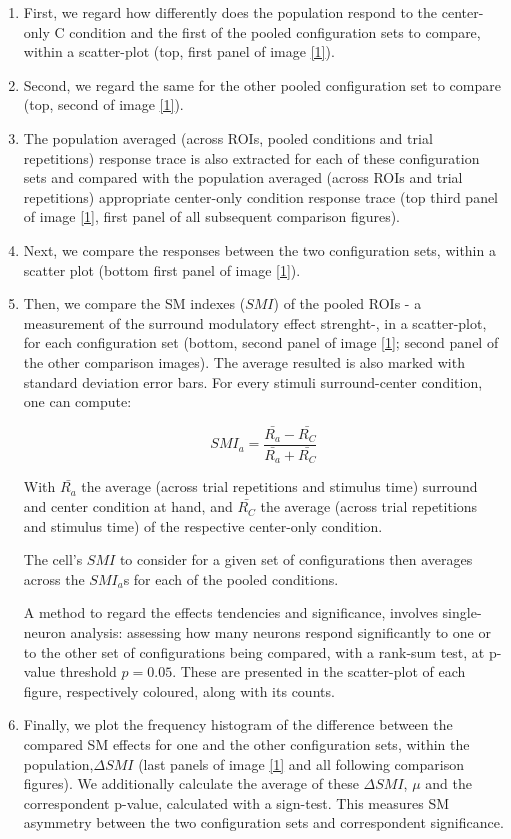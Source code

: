 \begin{enumerate}
\item First, we regard how differently does the population respond to the center-only C condition and the first of the pooled configuration sets to compare, within a scatter-plot (top, first panel of image \ref{1}). 

\item Second, we regard the same for the other pooled configuration set to compare (top, second of image \ref{1}). 

\item The population averaged (across ROIs, pooled conditions and trial repetitions) response trace is also extracted for each of these configuration sets and compared with the population averaged (across ROIs and trial repetitions) appropriate center-only condition response trace (top third panel of image \ref{1}, first panel of all subsequent comparison figures).

\item Next, we compare the responses between the two configuration sets, within a scatter plot (bottom first panel of image \ref{1}).

\item Then, we compare the SM indexes ($SMI$) of the pooled ROIs - a measurement of the surround modulatory effect strenght-, in a scatter-plot, for each configuration set (bottom, second panel of image \ref{1}; second panel of the other comparison images). The average resulted is also marked with standard deviation error bars. For every stimuli surround-center condition, one can compute:

\begin{equation}
SMI_a=\dfrac{\bar{R_{a}}-\bar{R_C}}{\bar{R_a}+\bar{R_C}}
\end{equation}

With $\bar{R_a}$ the average (across trial repetitions and stimulus time) surround and center condition at hand, and $\bar{R_C}$ the average  (across trial repetitions and stimulus time) of the respective center-only condition.

The cell's $SMI$ to consider for a given set of configurations then averages across the $SMI_a$s for each of the pooled conditions.

A method to regard the effects tendencies and significance, involves single-neuron analysis: assessing how many neurons respond significantly to one or to the other set of configurations being compared, with a rank-sum test, at p-value threshold $p=0.05$. These are presented in the scatter-plot of each figure, respectively coloured, along with its counts. 

\item Finally, we plot the frequency histogram of the difference between the compared SM effects for one and the other configuration sets, within the population,$\Delta SMI$ (last panels of image \ref{1} and all following comparison figures). We additionally calculate the average of these $\Delta SMI$, $\mu$ and the correspondent p-value, calculated with a sign-test. This measures SM asymmetry between the two configuration sets and correspondent significance.

\end{enumerate}

